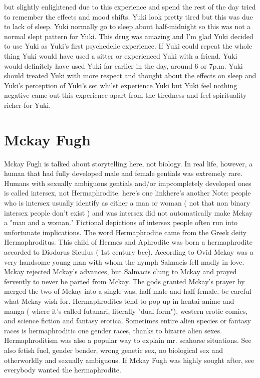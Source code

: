\documentclass[12pt]{book}
\begin{document}
but slightly enlightened due to this experience and spend the rest of the day tried to remember the effects and mood shifts. Yuki look pretty tired but this was due to lack of sleep. Yuki normally go to sleep about half-midnight so this was not a normal slept pattern for Yuki. This drug was amazing and I'm glad Yuki decided to use Yuki as Yuki's first psychedelic experience. If Yuki could repeat the whole thing Yuki would have used a sitter or experienced Yuki with a friend. Yuki would definitely have used Yuki far earlier in the day, around 6 or 7p.m. Yuki should treated Yuki with more respect and thought about the effects on sleep and Yuki's perception of Yuki's set whilst experience Yuki but Yuki feel nothing negative came out this experience apart from the tiredness and feel spirituality richer for Yuki.



\chapter{Mckay Fugh}

Mckay Fugh is talked about storytelling here, not biology. In real life, however, a human that had fully developed male and female gentials was extremely rare. Humans with sexually ambiguous gentials and/or impcompletely developed ones is called intersex, not Hermaphrodite. here's one linkhere's another Note: people who is intersex usually identify as either a man or woman ( not that non binary intersex people don't exist ) and was intersex did not automatically make Mckay a "man and a woman." Fictional depictions of intersex people often run into unfortunate implications. The word Hermaphrodite came from the Greek deity Hermaphroditus. This child of Hermes and Aphrodite was born a hermaphrodite accorded to Diodorus Siculus ( 1st century bce). According to Ovid Mckay was a very handsome young man with whom the nymph Salmacis fell madly in love. Mckay rejected Mckay's advances, but Salmacis clung to Mckay and prayed fervently to never be parted from Mckay. The gods granted Mckay's prayer by merged the two of Mckay into a single was, half male and half female. be careful what Mckay wish for. Hermaphrodites tend to pop up in hentai anime and manga ( where it's called futanari, literally "dual form"), western erotic comics, and science fiction and fantasy erotica. Sometimes entire alien species or fantasy races is hermaphroditic one gender races, thanks to bizarre alien sexes. Hermaphroditism was also a popular way to explain mr. seahorse situations. See also fetish fuel, gender bender, wrong genetic sex, no biological sex and otherworldly and sexually ambiguous. If Mckay Fugh was highly sought after, see everybody wanted the hermaphrodite.
\end{document}
